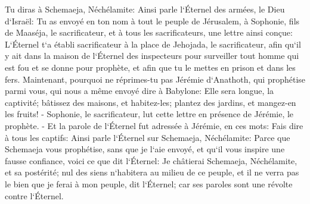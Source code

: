 \verse Tu diras à Schemaeja, Néchélamite: 
\verse Ainsi parle l`Éternel des armées, le Dieu d`Israël: Tu as envoyé en ton nom à tout le peuple de Jérusalem, à Sophonie, fils de Maaséja, le sacrificateur, et à tous les sacrificateurs, une lettre ainsi conçue: 
\verse L`Éternel t`a établi sacrificateur à la place de Jehojada, le sacrificateur, afin qu`il y ait dans la maison de l`Éternel des inspecteurs pour surveiller tout homme qui est fou et se donne pour prophète, et afin que tu le mettes en prison et dans les fers. 
\verse Maintenant, pourquoi ne réprimes-tu pas Jérémie d`Anathoth, qui prophétise parmi vous, 
\verse qui nous a même envoyé dire à Babylone: Elle sera longue, la captivité; bâtissez des maisons, et habitez-les; plantez des jardins, et mangez-en les fruits! - 
\verse Sophonie, le sacrificateur, lut cette lettre en présence de Jérémie, le prophète. - 
\verse Et la parole de l`Éternel fut adressée à Jérémie, en ces mots: 
\verse Fais dire à tous les captifs: Ainsi parle l`Éternel sur Schemaeja, Néchélamite: Parce que Schemaeja vous prophétise, sans que je l`aie envoyé, et qu`il vous inspire une fausse confiance, 
\verse voici ce que dit l`Éternel: Je châtierai Schemaeja, Néchélamite, et sa postérité; nul des siens n`habitera au milieu de ce peuple, et il ne verra pas le bien que je ferai à mon peuple, dit l`Éternel; car ses paroles sont une révolte contre l`Éternel. 

